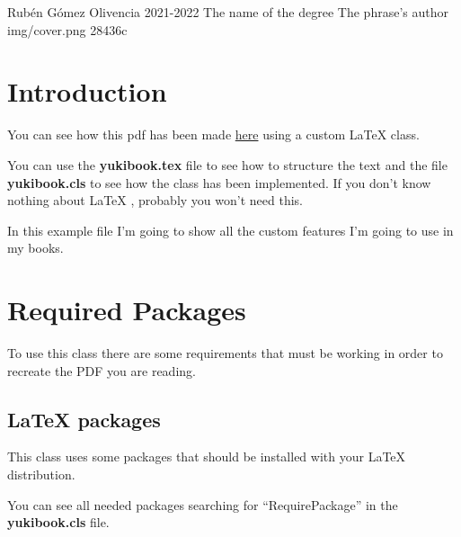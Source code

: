 \documentclass{\ClassPath/yukibook}
\begin{document}
  {Rubén Gómez Olivencia}  %
  {2021-2022}    %
  {The name \linebreak of the degree} %
  {} %
  {The phrase's author} %
  {img/cover.png}
  {28436c} %

\coverpage
\licensepage

\tableofcontents




\chapter{Introduction}
You can see how this pdf has been made \href{https://github.com/yuki/yukibook.cls}{here} using a custom \LaTeX{}  class.

You can use the \textbf{yukibook.tex} file to see how to structure the text and the file \textbf{yukibook.cls} to see how the class has been implemented. If you don't know nothing about \LaTeX{} , probably you won't need this.

In this example file I'm going to show all the custom features I'm going to use in my books.

\chapter{Required Packages}
To use this class there are some requirements that must be working in order to recreate the PDF you are reading.
\section{\LaTeX{} packages}

This class uses some packages that should be installed with your \LaTeX{} distribution.

You can see all needed packages searching for “RequirePackage” in the \textbf{yukibook.cls} file.
\end{document}
